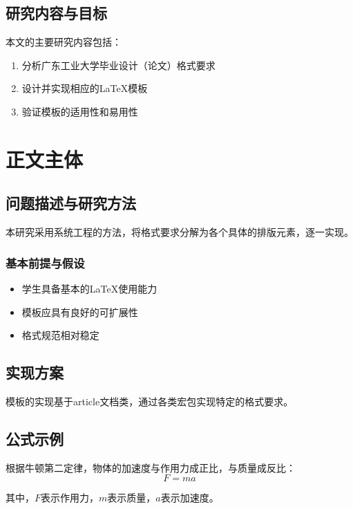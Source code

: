 \documentclass[12pt,a4paper]{article}
\numberwithin{equation}{section}
\begin{document}
\subsection{研究内容与目标}
本文的主要研究内容包括：
\begin{enumerate}[label=\arabic*.,leftmargin=2em]
    \item 分析广东工业大学毕业设计（论文）格式要求
    \item 设计并实现相应的LaTeX模板
    \item 验证模板的适用性和易用性
\end{enumerate}

\section{正文主体}
\label{sec:mainbody}

\subsection{问题描述与研究方法}
本研究采用系统工程的方法，将格式要求分解为各个具体的排版元素，逐一实现。

\subsubsection{基本前提与假设}
\begin{itemize}[leftmargin=2em]
    \item 学生具备基本的LaTeX使用能力
    \item 模板应具有良好的可扩展性
    \item 格式规范相对稳定
\end{itemize}

\subsection{实现方案}
模板的实现基于article文档类，通过各类宏包实现特定的格式要求。

\subsection{公式示例}
\label{subsec:formula}

根据牛顿第二定律，物体的加速度与作用力成正比，与质量成反比：
\begin{equation}
    F = ma
    \label{eq:newton}
\end{equation}

其中，$F$表示作用力，$m$表示质量，$a$表示加速度。
\end{document}
